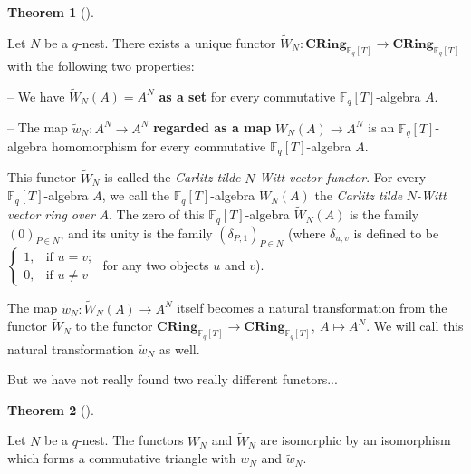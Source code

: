 \documentclass[numbers=enddot,12pt,final,onecolumn,notitlepage]{scrartcl}%
\theoremstyle{definition}
\newtheorem{theo}{Theorem}[section]
\newenvironment{theorem}[1][]
{\begin{theo}[#1]\begin{leftbar}}
{\end{leftbar}\end{theo}}
\begin{document}
\begin{theorem}
\label{thm.carlitz.Witt.class.tilde}Let $N$ be a $q$-nest. There exists a
unique functor $\widetilde{W}_{N}:\mathbf{CRing}_{\mathbb{F}_{q}\left[
T\right]  }\rightarrow\mathbf{CRing}_{\mathbb{F}_{q}\left[  T\right]  }$ with
the following two properties:

-- We have $\widetilde{W}_{N}\left(  A\right)  =A^{N}$ \textbf{as a set} for
every commutative $\mathbb{F}_{q}\left[  T\right]  $-algebra $A$.

-- The map $\widetilde{w}_{N}:A^{N}\rightarrow A^{N}$ \textbf{regarded as a
map }$\widetilde{W}_{N}\left(  A\right)  \rightarrow A^{N}$ is an
$\mathbb{F}_{q}\left[  T\right]  $-algebra homomorphism for every commutative
$\mathbb{F}_{q}\left[  T\right]  $-algebra $A$.

This functor $\widetilde{W}_{N}$ is called the \textit{Carlitz tilde }%
$N$\textit{-Witt vector functor}. For every $\mathbb{F}_{q}\left[  T\right]
$-algebra $A$, we call the $\mathbb{F}_{q}\left[  T\right]  $-algebra
$\widetilde{W}_{N}\left(  A\right)  $ the \textit{Carlitz tilde }%
$N$\textit{-Witt vector ring over }$A$. The zero of this $\mathbb{F}%
_{q}\left[  T\right]  $-algebra $\widetilde{W}_{N}\left(  A\right)  $ is the
family $\left(  0\right)  _{P\in N}$, and its unity is the family $\left(
\delta_{P,1}\right)  _{P\in N}$ (where $\delta_{u,v}$ is defined to be $%
\begin{cases}
1, & \text{if }u=v;\\
0, & \text{if }u\neq v
\end{cases}
$ for any two objects $u$ and $v$).

The map $\widetilde{w}_{N}:\widetilde{W}_{N}\left(  A\right)  \rightarrow
A^{N}$ itself becomes a natural transformation from the functor $\widetilde{W}%
_{N}$ to the functor $\mathbf{CRing}_{\mathbb{F}_{q}\left[  T\right]
}\rightarrow\mathbf{CRing}_{\mathbb{F}_{q}\left[  T\right]  },\ A\mapsto
A^{N}$. We will call this natural transformation $\widetilde{w}_{N}$ as well.
\end{theorem}

But we have not really found two really different functors...

\begin{theorem}
\label{thm.carlitz.Witt.W=W}Let $N$ be a $q$-nest. The functors $W_{N}$ and
$\widetilde{W}_{N}$ are isomorphic by an isomorphism which forms a commutative
triangle with $w_{N}$ and $\widetilde{w}_{N}$.
\end{theorem}
\end{document}
